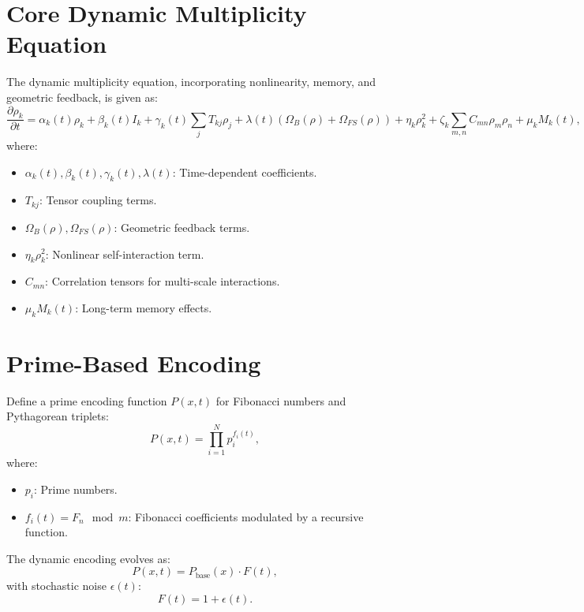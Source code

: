 \documentclass[11pt]{article}
\begin{document}
\section{Core Dynamic Multiplicity Equation}
The dynamic multiplicity equation, incorporating nonlinearity, memory, and geometric feedback, is given as:
\begin{equation}
    \frac{\partial \rho_k}{\partial t} = \alpha_k(t) \rho_k + \beta_k(t) I_k + \gamma_k(t) \sum_{j} T_{kj} \rho_j + \lambda(t) (\Omega_B(\rho) + \Omega_{FS}(\rho)) + \eta_k \rho_k^2 + \zeta_k \sum_{m,n} C_{mn} \rho_m \rho_n + \mu_k M_k(t),
\end{equation}
where:
\begin{itemize}
    \item $\alpha_k(t), \beta_k(t), \gamma_k(t), \lambda(t)$: Time-dependent coefficients.
    \item $T_{kj}$: Tensor coupling terms.
    \item $\Omega_B(\rho), \Omega_{FS}(\rho)$: Geometric feedback terms.
    \item $\eta_k \rho_k^2$: Nonlinear self-interaction term.
    \item $C_{mn}$: Correlation tensors for multi-scale interactions.
    \item $\mu_k M_k(t)$: Long-term memory effects.
\end{itemize}

\section{Prime-Based Encoding}
Define a prime encoding function $P(x, t)$ for Fibonacci numbers and Pythagorean triplets:
\begin{equation}
    P(x, t) = \prod_{i=1}^{N} p_i^{f_i(t)},
\end{equation}
where:
\begin{itemize}
    \item $p_i$: Prime numbers.
    \item $f_i(t) = F_n \mod m$: Fibonacci coefficients modulated by a recursive function.
\end{itemize}
The dynamic encoding evolves as:
\begin{equation}
    P(x, t) = P_{\text{base}}(x) \cdot F(t),
\end{equation}
with stochastic noise $\epsilon(t)$:
\begin{equation}
    F(t) = 1 + \epsilon(t).
\end{equation}
\end{document}
